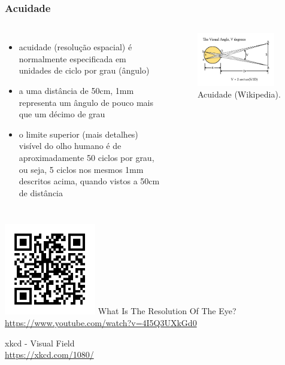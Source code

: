 \begin{frame}[allowframebreaks]
  \frametitle{Acuidade}

   \begin{columns}[c]
   \begin{itemize}
   \item acuidade (resolução espacial) é normalmente especificada em unidades de ciclo por grau (ângulo)
   \item a uma distância de 50cm, 1mm representa um ângulo de pouco mais que um décimo de grau
   \item o limite superior (mais detalhes) visível do olho humano é de aproximadamente 50 ciclos por grau, ou seja,
        5 ciclos nos mesmos 1mm descritos acima, quando vistos a 50cm de distância
   \end{itemize}
   
   \begin{figure}[h]
   \centering
   \includegraphics[width=0.9\textwidth]{images/eyeangle.pdf}
   \caption{Acuidade (Wikipedia).}\label{fig-eyeangle}
   \end{figure}
   \end{columns}
 
  \framebreak 

  \includegraphics[width=0.3\textwidth]{images/qrcode-yt-eye-res.pdf} 
  What Is The Resolution Of The Eye?\\
  \url{https://www.youtube.com/watch?v=4I5Q3UXkGd0}

  xkcd - Visual Field\\
  \url{https://xkcd.com/1080/}
\end{frame}


